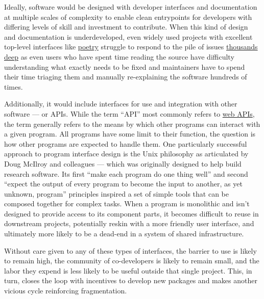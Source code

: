 Ideally, software would be designed with developer interfaces and
documentation at multiple scales of complexity to enable clean
entrypoints for developers with differing levels of skill and investment
to contribute. When this kind of design and documentation is
underdeveloped, even widely used projects with excellent top-level
interfaces like \href{https://python-poetry.org/}{poetry} struggle to
respond to the pile of issues
\href{https://github.com/python-poetry/poetry/issues}{thousands deep} as
even users who have spent time reading the source have difficulty
understanding what exactly needs to be fixed and maintainers have to
spend their time triaging them and manually re-explaining the software
hundreds of times.

Additionally, it would include interfaces for use and integration with
other software --- or APIs. While the term ``API'' most commonly refers
to \href{https://en.wikipedia.org/wiki/Web_API}{web APIs}, the term
generally refers to the means by which other programs can interact with
a given program. All programs have some limit to their function, the
question is how other programs are expected to handle them. One
particularly successful approach to program interface design is the Unix
philosophy as articulated by Doug McIlroy and colleagues \citep{mcilroyUNIXTimeSharingSystem1978}  --- which was originally designed
to help build research software. Its first ``make each program do one
thing well'' and second ``expect the output of every program to become
the input to another, as yet unknown, program'' principles inspired a
set of simple tools that can be composed together for complex tasks.
When a program is monolithic and isn't designed to provide access to its
component parts, it becomes difficult to reuse in downstream projects,
potentially reskin with a more friendly user interface, and ultimately
more likely to be a dead-end in a system of shared infrastructure.

Without care given to any of these types of interfaces, the barrier to
use is likely to remain high, the community of co-developers is likely
to remain small, and the labor they expend is less likely to be useful
outside that single project. This, in turn, closes the loop with
incentives to develop new packages and makes another vicious cycle
reinforcing fragmentation.

